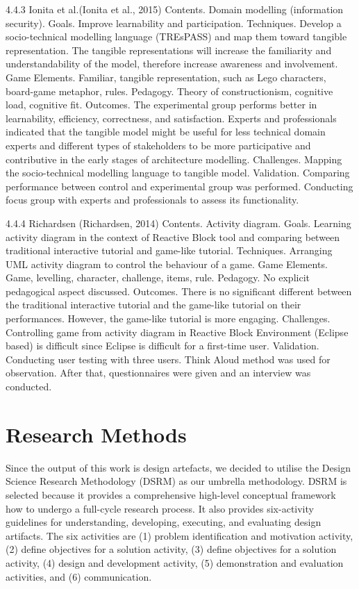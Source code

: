 \documentclass[runningheads,a4paper]{llncs}
\begin{document}
4.4.3 Ionita et al.(Ionita et al., 2015)
Contents. Domain modelling (information security).
Goals. Improve learnability and participation. 
Techniques. Develop a socio-technical modelling language (TREsPASS) and map them toward tangible representation. The tangible representations will increase the familiarity and understandability of the model, therefore increase awareness and involvement. 
Game Elements. Familiar, tangible representation, such as Lego characters, board-game metaphor, rules.
Pedagogy. Theory of constructionism, cognitive load, cognitive fit.
Outcomes. The experimental group performs better in learnability, efficiency, correctness, and satisfaction. Experts and professionals indicated that the tangible model might be useful for less technical domain experts and different types of stakeholders to be more participative and contributive in the early stages of architecture modelling. 
Challenges. Mapping the socio-technical modelling language to tangible model.
Validation. Comparing performance between control and experimental group was performed. Conducting focus group with experts and professionals to assess its functionality.

4.4.4 Richardsen (Richardsen, 2014)
Contents. Activity diagram.
Goals. Learning activity diagram in the context of Reactive Block tool and comparing between traditional interactive tutorial and game-like tutorial.
Techniques. Arranging UML activity diagram to control the behaviour of a game.
Game Elements. Game, levelling, character, challenge, items, rule.
Pedagogy. No explicit pedagogical aspect discussed.
Outcomes. There is no significant different between the traditional interactive tutorial and the game-like tutorial on their performances. However, the game-like tutorial is more engaging.
Challenges. Controlling game from activity diagram in Reactive Block Environment (Eclipse based) is difficult since Eclipse is difficult for a first-time user. 
Validation. Conducting user testing with three users. Think Aloud method was used for observation. After that, questionnaires were given and an interview was conducted.



\section{Research Methods}
Since the output of this work is design artefacts, we decided to utilise the Design Science Research Methodology (DSRM) \cite{peffers2007design} as our umbrella methodology. DSRM is selected because it provides a comprehensive high-level conceptual framework how to undergo a full-cycle research process. It also provides six-activity guidelines for understanding, developing, executing, and evaluating design artifacts. The six activities are (1) problem identification and motivation activity, (2) define objectives for a solution activity, (3) define objectives for a solution activity, (4) design and development activity, (5) demonstration and evaluation activities, and (6) communication. 
\end{document}
